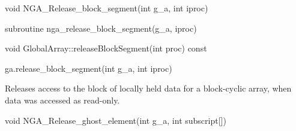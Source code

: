 \documentclass[12pt]{article}
\begin{document}

\begin{capi}
\begin{ccode}
void NGA_Release_block_segment(int g_a, int iproc)
\end{ccode}
\begin{funcargs}
\end{funcargs}
\end{capi}

\begin{fapi}
\begin{fcode}
subroutine nga_release_block_segment(g_a, iproc)
\end{fcode}
\begin{funcargs}
\end{funcargs}
\end{fapi}

\begin{cxxapi}
\begin{cxxcode}
void GlobalArray::releaseBlockSegment(int proc) const
\end{cxxcode}
\begin{funcargs}
\end{funcargs}
\end{cxxapi}

\begin{pyapi}
\begin{pycode}
ga.release_block_segment(int g_a, int iproc)
\end{pycode}
\begin{funcargs}
\end{funcargs}
\end{pyapi}

\local

\begin{desc}

Releases access to the block of locally held data for a block-cyclic array,
when data was accessed as read-only.

\end{desc}



\begin{capi}
\begin{ccode}
void NGA_Release_ghost_element(int g_a, int subscript[])
\end{ccode}
\begin{funcargs}
\end{funcargs}
\end{capi}
\end{document}
